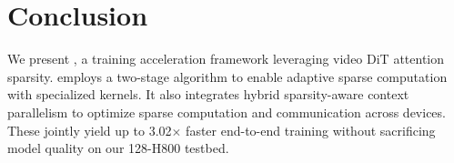 \section{Conclusion}

We present \sys, a training acceleration framework leveraging video DiT attention sparsity. \sys employs a two-stage algorithm to enable adaptive sparse computation with specialized kernels. It also integrates hybrid sparsity-aware context parallelism to optimize sparse computation and communication across devices. These jointly yield up to 3.02$\times$ faster end-to-end training without sacrificing model quality on our 128-H800 testbed.


